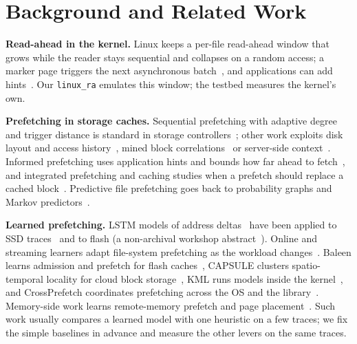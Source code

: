 
\section{Background and Related Work}\label{sec:related}

\textbf{Read-ahead in the kernel.} Linux keeps a per-file read-ahead window
that grows while the reader stays sequential and collapses on a random
access; a marker page triggers the next asynchronous
batch~\cite{wu2007readahead,wu2010concurrent,linux_mmapi_readahead}, and
applications can add hints~\cite{man_posix_fadvise,man_readahead}. Our
\texttt{linux\_ra} emulates this window; the testbed measures the kernel's
own.

\textbf{Prefetching in storage caches.} Sequential prefetching with adaptive
degree and trigger distance is standard in storage
controllers~\cite{gill2005sarc,gill2007amp}; other work exploits disk layout
and access history~\cite{ding2007diskseen}, mined block
correlations~\cite{li2004cminer} or server-side
context~\cite{soundararajan2008context}. Informed prefetching uses application
hints and bounds how far ahead to fetch~\cite{patterson1995informed}, and
integrated prefetching and caching studies when a prefetch should replace a
cached block~\cite{cao1995integrated}. Predictive file prefetching goes back to
probability graphs and Markov predictors~\cite{griffioen1994reducing,
kroeger2001design,joseph1997markov}.

\textbf{Learned prefetching.} LSTM models of address
deltas~\cite{hochreiter1997lstm,hashemi2018learning} have been applied to SSD
traces~\cite{chakraborttii2020learning} and to flash (a non-archival
workshop abstract~\cite{chakraborttii2022deep}). Online and streaming learners
adapt file-system prefetching as the workload
changes~\cite{savva2026adaptive,lucasfilho2023streaming}. Baleen learns
admission and prefetch for flash caches~\cite{wong2024baleen}, CAPSULE clusters
spatio-temporal locality for cloud block storage~\cite{ramadhan2026capsule},
KML runs models inside the kernel~\cite{akgun2021kml}, and CrossPrefetch
coordinates prefetching across the OS and the library~\cite{garg2024crossprefetch}.
Memory-side work learns remote-memory prefetch and page
placement~\cite{maruf2020leap,doudali2019kleio}. Such work usually compares a
learned model with one heuristic on a few traces; we fix the simple baselines
in advance and measure the other levers on the same traces.


